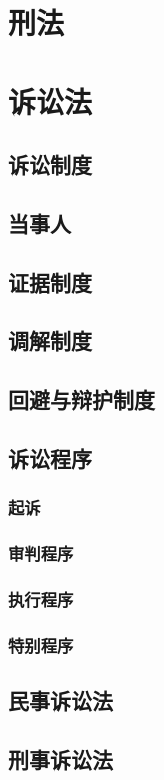 \documentclass[UTF8]{../ApplicationUniverse}
\begin{document}
\section{刑法}
\section{诉讼法}
        \subsection{诉讼制度}
        \subsection{当事人}
        \subsection{证据制度}
        \subsection{调解制度}
        \subsection{回避与辩护制度}
        \subsection{诉讼程序}
            \subsubsection{起诉}
            \subsubsection{审判程序}
            \subsubsection{执行程序}
            \subsubsection{特别程序}
        \subsection{民事诉讼法}
        \subsection{刑事诉讼法}
\end{document}
